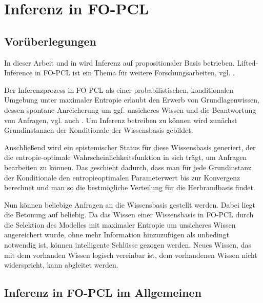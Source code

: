 \documentclass[a4paper, 11pt]{book}
\begin{document}
\chapter{Inferenz in FO-PCL}\label{Inferenz}
\section{Vorüberlegungen}
In dieser Arbeit und in \cite{Fis12} wird Inferenz auf propositionaler Basis betrieben. Lifted-Inference in FO-PCL ist ein Thema für weitere Forschungsarbeiten, vgl. \cite[Kap.8, S. 194]{Fis12}.

Der Inferenzprozess in FO-PCL als einer probabilistischen, konditionalen Umgebung unter maximaler Entropie erlaubt den Erwerb von Grundlagenwissen, dessen spontane Anreicherung um ggf. unsicheres Wissen und die Beantwortung von Anfragen, vgl. auch \cite{RRK06}.
Um Inferenz betreiben zu können wird zunächst Grundinstanzen  der Konditionale der Wissensbasis gebildet.

 Anschließend wird ein epistemischer Status für diese Wissensbasis generiert, der die entropie-optimale Wahrscheinlichkeitsfunktion in sich trägt, um Anfragen bearbeiten zu können. Das geschieht dadurch, dass man für jede Grundinstanz der Konditionale den entropieoptimalen Parameterwert bis zur Konvergenz berechnet und man so die bestmögliche Verteilung für die Herbrandbasis findet.

Nun können beliebige Anfragen an die Wissensbasis gestellt werden. Dabei liegt die Betonung auf beliebig. Da das Wissen einer Wissensbasis in FO-PCL durch die Selektion des Modelles mit maximaler Entropie um unsicheres Wissen angereichert wurde, ohne mehr Information hinzuzufügen als unbedingt notwendig ist, können intelligente Schlüsse gezogen werden. Neues Wissen, das mit dem vorhanden Wissen logisch vereinbar ist, dem vorhandenen Wissen nicht widerspricht, kann abgleitet werden. 

\section{Inferenz in FO-PCL im Allgemeinen}
\end{document}
